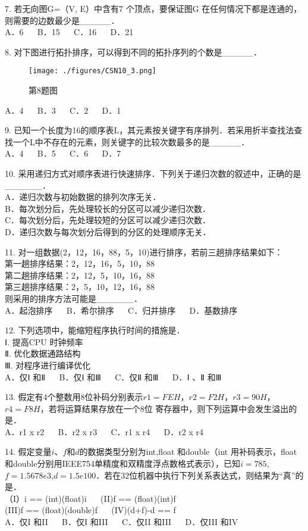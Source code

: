 7. 若无向图G=（V, E）中含有7 个顶点，要保证图G 在任何情况下都是连通的，则需要的边数最少是_____． \\
A．6 $\quad$ B．15 $\quad$ C．16 $\quad$ D．21

8. 对下图进行拓扑排序，可以得到不同的拓扑序列的个数是_____． \\
\begin{figure}[ht]
\centering
\texttt{[image: ./figures/CSN10\_3.png]}
\caption{第8题图} \label{CSN10_fig3}
\end{figure}
A．4 $\quad$ B．3 $\quad$ C．2 $\quad$ D．1

9. 已知一个长度为16的顺序表L，其元素按关键字有序排列．若采用折半查找法查找一个L中不存在的元素，则关键字的比较次数最多的是_____． \\
A．4 $\quad$ B．5 $\quad$ C．6 $\quad$ D．7

10. 采用递归方式对顺序表进行快速排序．下列关于递归次数的叙述中，正确的是______． \\
A．递归次数与初始数据的排列次序无关． \\
B．每次划分后，先处理较长的分区可以减少递归次数． \\
C．每次划分后，先处理较短的分区可以减少递归次数． \\
D．递归次数与每次划分后得到的分区的处理顺序无关．

11. 对一组数据(2，12，16，88，5，10)进行排序，若前三趟排序结果如下： \\
第一趟排序结果：2，12，16，5，10，88 \\
第二趟排序结果：2，12，5，10，16，88 \\
第三趟排序结果：2，5，10，12，16，88 \\
则采用的排序方法可能是______． \\
A．起泡排序 $\quad$ B．希尔排序 $\quad$ C．归并排序 $\quad$ D．基数排序

12. 下列选项中，能缩短程序执行时间的措施是． \\
Ⅰ. 提高CPU 时钟频率 \\
Ⅱ. 优化数据通路结构 \\
Ⅲ. 对程序进行编译优化 \\
A．仅Ⅰ 和Ⅱ $\quad$ B．仅Ⅰ 和Ⅲ $\quad$ C．仅Ⅱ 和Ⅲ $\quad$ D．Ⅰ 、Ⅱ 和Ⅲ

13. 假定有4个整数用8位补码分别表示$r1=FEH$，$r2=F2H$，$r3=90H$，$r4=F8H$，若将运算结果存放在一个8位
寄存器中，则下列运算中会发生溢出的是． \\
A．r1 x r2 $\quad$ B．r2 x r3 $\quad$ C．r1 x r4 $\quad$ D．r2 x r4

14. 假定变量$i$、$f$和$d$的数据类型分别为int,float 和double（int 用补码表示，float 和double分别用IEEE754单精度和双精度浮点数格式表示），已知$i=785$,$f=1.5678e3$,$d=1.5e100$．若在$32$位机器中执行下列关系表达式，则结果为“真”的是． \\
（I）i == (int)(float)i $\quad$ (II)f == (float)(int)f \\
(III)f == (float)(double)f $\quad$ (IV)(d+f)-d == f \\
A．仅I 和II $\quad$ B．仅I 和III $\quad$ C．仅II 和III $\quad$ D．仅III 和IV


